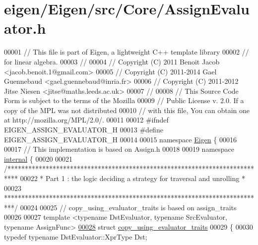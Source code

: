 \hypertarget{eigen_2_eigen_2src_2_core_2_assign_evaluator_8h_source}{}\section{eigen/\+Eigen/src/\+Core/\+Assign\+Evaluator.h}
\label{eigen_2_eigen_2src_2_core_2_assign_evaluator_8h_source}

\begin{DoxyCode}
00001 \textcolor{comment}{// This file is part of Eigen, a lightweight C++ template library}
00002 \textcolor{comment}{// for linear algebra.}
00003 \textcolor{comment}{//}
00004 \textcolor{comment}{// Copyright (C) 2011 Benoit Jacob <jacob.benoit.1@gmail.com>}
00005 \textcolor{comment}{// Copyright (C) 2011-2014 Gael Guennebaud <gael.guennebaud@inria.fr>}
00006 \textcolor{comment}{// Copyright (C) 2011-2012 Jitse Niesen <jitse@maths.leeds.ac.uk>}
00007 \textcolor{comment}{//}
00008 \textcolor{comment}{// This Source Code Form is subject to the terms of the Mozilla}
00009 \textcolor{comment}{// Public License v. 2.0. If a copy of the MPL was not distributed}
00010 \textcolor{comment}{// with this file, You can obtain one at http://mozilla.org/MPL/2.0/.}
00011 
00012 \textcolor{preprocessor}{#ifndef EIGEN\_ASSIGN\_EVALUATOR\_H}
00013 \textcolor{preprocessor}{#define EIGEN\_ASSIGN\_EVALUATOR\_H}
00014 
00015 \textcolor{keyword}{namespace }\hyperlink{namespace_eigen}{Eigen} \{
00016 
00017 \textcolor{comment}{// This implementation is based on Assign.h}
00018 
00019 \textcolor{keyword}{namespace }\hyperlink{namespaceinternal}{internal} \{
00020   
00021 \textcolor{comment}{/***************************************************************************}
00022 \textcolor{comment}{* Part 1 : the logic deciding a strategy for traversal and unrolling       *}
00023 \textcolor{comment}{***************************************************************************/}
00024 
00025 \textcolor{comment}{// copy\_using\_evaluator\_traits is based on assign\_traits}
00026 
00027 \textcolor{keyword}{template} <\textcolor{keyword}{typename} DstEvaluator, \textcolor{keyword}{typename} SrcEvaluator, \textcolor{keyword}{typename} AssignFunc>
\hyperlink{struct_eigen_1_1internal_1_1copy__using__evaluator__traits}{00028} \textcolor{keyword}{struct }\hyperlink{struct_eigen_1_1internal_1_1copy__using__evaluator__traits}{copy\_using\_evaluator\_traits}
00029 \{
00030   \textcolor{keyword}{typedef} \textcolor{keyword}{typename} DstEvaluator::XprType Dst;

\end{DoxyCode}
